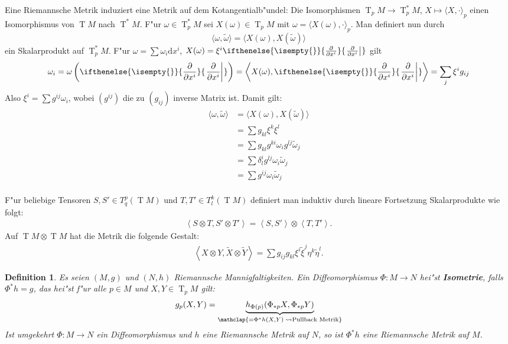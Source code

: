 \documentclass[paper=A4, twoside, chapterprefix=true, bibliography=totoc, headsepline]{scrbook}
\DeclareMathOperator{\T}{T}         %
\newcommand{\dop}{\mathrm{d}}
\newcommand{\pdifffrac}[3][]{\ifthenelse{\isempty{#1}}{\frac{\partial #2}{\partial #3}}{\left. \frac{\partial #2}{\partial #3} \right|_{#1}}}
\theoremstyle{plain}
\newtheorem{Dfn}{Definition}[chapter]
\theoremstyle{nonumberplain}
\theoremstyle{empty}
\theoremstyle{break}
\newcommand{\CmIndex}[2][]{\ifthenelse{\isempty{#1}}{\index{#2}}{\index{#1}}#2}
\newcommand{\CmMark}[2][]{\textbf{\CmIndex[#1]{#2}}}
\begin{document}
Eine Riemannsche Metrik induziert eine Metrik auf dem Kotangentialb"undel: Die Isomorphismen $\T_pM \to \T_p^*M$, $X \mapsto \langle X, \cdot \rangle_p$ einen Isomorphismus von $\T M$ nach $\T^*M$.
F"ur $\omega \in \T_p^*M$ sei $X(\omega) \in \T_pM$ mit $\omega = \langle X(\omega), \cdot \rangle_p$.
Man definiert nun durch
\[ \langle \omega, \tilde \omega \rangle = \langle X(\omega), X(\tilde \omega) \rangle \]
ein Skalarprodukt auf $\T_p^*M$. F"ur $\omega = \sum \omega_i \dop x^{i}$, $X(\omega) = \xi^{i} \pdifffrac{}{x^{i}}$ gilt
\[ \omega_i = \omega \left( \pdifffrac{}{x^{i}} \right) = \left\langle X(\omega), \pdifffrac{}{x^{i}} \right\rangle = \sum_j \xi^{i} g_{ij} \]
Also $\xi^{i} = \sum g^{ij} \omega_i$, wobei $(g^{ij})$ die zu $(g_{ij})$ inverse Matrix ist.
Damit gilt:
\begin{align*}
  \langle \omega, \tilde \omega \rangle &= \langle X(\omega), X(\tilde \omega) \rangle \\
  &= \sum g_{kl} \xi^k \xi^l\\
  &= \sum g_{kl} g^{ki} \omega_i g^{lj} \tilde \omega_j\\
  &= \sum \delta_l^i g^{lj} \omega_i \tilde \omega_j\\
  &= \sum g^{ij} \omega_i \tilde \omega_j\\
\end{align*}



F"ur beliebige Tensoren $S, S' \in T_q^p(\T M)$ und $T, T' \in T_l^k(\T M)$ definiert man induktiv durch lineare Fortsetzung Skalarprodukte wie folgt:
\begin{align*}
  \left<S \otimes T, S' \otimes T'\right> = \left<S,S'\right> \otimes \left<T,T'\right>.
\end{align*}
Auf $\T M \otimes \T M$ hat die Metrik die folgende Gestalt:
\begin{align*}
  \left<X \otimes Y,\tilde X \otimes \tilde Y\right> = \sum g_{ij}g_{kl}\xi^i\tilde\xi^j\eta^k\tilde\eta^l.
\end{align*}

\begin{Dfn}
  Es seien $(M, g)$ und $(N,h)$ Riemannsche Mannigfaltigkeiten.
Ein Diffeomorphismus $\Phi \colon M \to N$ hei"st \CmMark{Isometrie}, falls $\Phi^{*}h = g$, das hei"st f"ur alle $p \in M$ und $X,Y \in \T_pM$ gilt:
\begin{align*}
  g_p(X,Y) = \underbrace{h_{\Phi(p)}(\Phi_{*p}X,\Phi_{*p}Y)}_{\mathclap{= \Phi^{*}h(X,Y) \; \rightsquigarrow \text{Pullback Metrik}}}
\end{align*}
Ist umgekehrt $\Phi \colon M \to N$ ein Diffeomorphismus und $h$ eine Riemannsche Metrik auf $N$, so ist $\Phi^{*}h$ eine Riemannsche Metrik auf $M$.
\end{Dfn}
\end{document}

